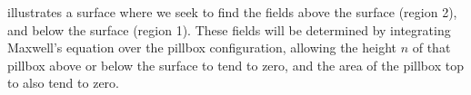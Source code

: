 %
%


 illustrates a surface where we seek to find the fields above the surface (region 2), and below the surface (region 1).
These fields will be determined by integrating Maxwell's equation over the pillbox configuration, allowing the height \( n \) of that pillbox above or below the surface to tend to zero,
and the area of the pillbox top to also tend to zero.


